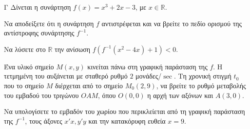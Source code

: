 \begin{thema}{Γ}
Δίνεται η συνάρτηση $f(x) = x^3 + 2x - 3$, με $x \in \mathbb{R}$.
\begin{erwthma}
  \item Να αποδείξετε ότι η συνάρτηση $f$ αντιστρέφεται και να βρείτε το πεδίο ορισμού της αντίστροφης συνάρτησης $f^{-1}$.
  \item Να λύσετε στο $\mathbb{R}$ την ανίσωση $f\left(f^{-1}(x^2 - 4x) + 1\right) < 0$.
  \item Ένα υλικό σημείο $M(x, y)$ κινείται πάνω στη γραφική παράσταση της $f$. Η τετμημένη του αυξάνεται με σταθερό ρυθμό $2$ μονάδες/$\sec$. Τη χρονική στιγμή $t_0$ που το σημείο $M$ διέρχεται από το σημείο $M_0(2, 9)$, να βρείτε το ρυθμό μεταβολής του εμβαδού του τριγώνου $OAM$, όπου $O(0,0)$ η αρχή των αξόνων και $A(3, 0)$.
  \item Να υπολογίσετε το εμβαδόν του χωρίου που περικλείεται από τη γραφική παράσταση της $f^{-1}$, τους άξονες $x'x, y'y$ και την κατακόρυφη ευθεία $x = 9$.
\end{erwthma}
\end{thema}
